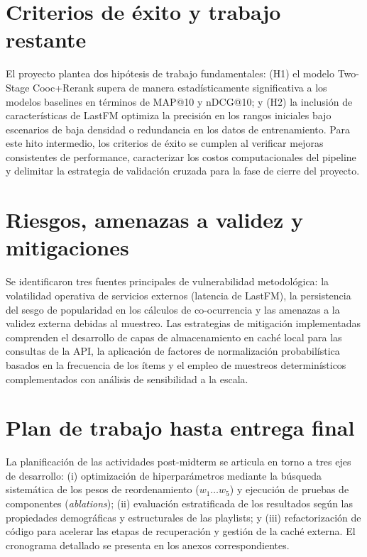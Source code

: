 \documentclass[10pt,letterpaper]{article}
\begin{document}
\section{Criterios de éxito y trabajo restante}

El proyecto plantea dos hipótesis de trabajo fundamentales: (H1) el modelo Two-Stage Cooc+Rerank supera de manera estadísticamente significativa a los modelos baselines en términos de MAP@10 y nDCG@10; y (H2) la inclusión de características de LastFM optimiza la precisión en los rangos iniciales bajo escenarios de baja densidad o redundancia en los datos de entrenamiento. Para este hito intermedio, los criterios de éxito se cumplen al verificar mejoras consistentes de performance, caracterizar los costos computacionales del pipeline y delimitar la estrategia de validación cruzada para la fase de cierre del proyecto.

\section{Riesgos, amenazas a validez y mitigaciones}

Se identificaron tres fuentes principales de vulnerabilidad metodológica: la volatilidad operativa de servicios externos (latencia de LastFM), la persistencia del sesgo de popularidad en los cálculos de co-ocurrencia y las amenazas a la validez externa debidas al muestreo. Las estrategias de mitigación implementadas comprenden el desarrollo de capas de almacenamiento en caché local para las consultas de la API, la aplicación de factores de normalización probabilística basados en la frecuencia de los ítems y el empleo de muestreos determinísticos complementados con análisis de sensibilidad a la escala.

\section{Plan de trabajo hasta entrega final}

La planificación de las actividades post-midterm se articula en torno a tres ejes de desarrollo: (i) optimización de hiperparámetros mediante la búsqueda sistemática de los pesos de reordenamiento ($w_1 \dots w_5$) y ejecución de pruebas de componentes (\textit{ablations}); (ii) evaluación estratificada de los resultados según las propiedades demográficas y estructurales de las playlists; y (iii) refactorización de código para acelerar las etapas de recuperación y gestión de la caché externa. El cronograma detallado se presenta en los anexos correspondientes.
\end{document}
